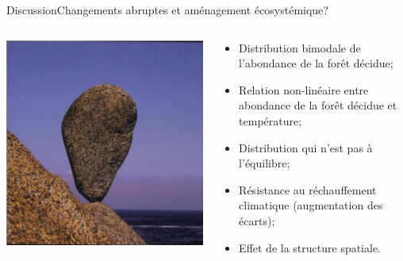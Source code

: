 \documentclass{eecslides}
\begin{document}
	\begin{frame}{Discussion}{Changements abruptes et aménagement écosystémique?}
		\begin{columns}
			\begin{column}{0.5\textwidth}
				\begin{center}
				\includegraphics[height=0.6\textheight]{scheffer}\\
				\end{center}
			\end{column}
			\begin{column}{0.5\textwidth}
				\begin{itemize}
				\item Distribution bimodale de l'abondance de la forêt décidue;
				\item Relation non-linéaire entre abondance de la forêt décidue et température;
				\item Distribution qui n'est pas à l'équilibre;
				\item Résistance au réchauffement climatique (augmentation des écarts);
				\item Effet de la structure spatiale.
				\end{itemize}
			\end{column}
		\end{columns}	
	\end{frame}
\end{document}
